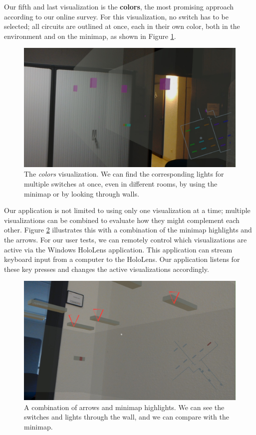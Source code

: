 Our fifth and last visualization is the \textbf{colors}, the most promising approach according to our online survey. For this visualization, no switch has to be selected; all circuits are outlined at once, each in their own color, both in the environment and on the minimap, as shown in Figure \ref{fig:colors_vis}.

\begin{figure}
    \centering
    \includegraphics[width=1.0\linewidth]{resources/implementation/colors.jpg}
    \caption{The \textit{colors} visualization. We can find the corresponding lights for multiple switches at once, even in different rooms, by using the minimap or by looking through walls.}
    \label{fig:colors_vis}
\end{figure}

Our application is not limited to using only one visualization at a time; multiple visualizations can be combined to evaluate how they might complement each other. Figure \ref{fig:combo_vis} illustrates this with a combination of the minimap highlights and the arrows. For our user tests, we can remotely control which visualizations are active via the Windows HoloLens application. This application can stream keyboard input from a computer to the HoloLens. Our application listens for these key presses and changes the active visualizations accordingly.

\begin{figure}
    \centering
    \includegraphics[width=1.0\linewidth]{resources/implementation/combo.jpg}
    \caption{A combination of arrows and minimap highlights. We can see the switches and lights through the wall, and we can compare with the minimap.}
    \label{fig:combo_vis}
\end{figure}
